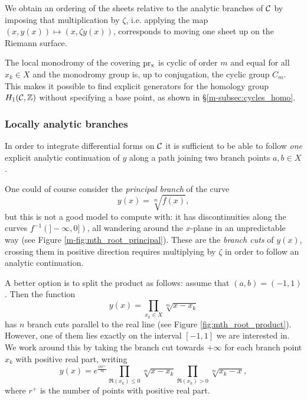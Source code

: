 \documentclass[main.tex]{subfiles}
\begin{document}
  \bigskip

  We obtain an ordering of the sheets relative
  to the analytic branches of $\mathcal{C}$ by imposing that multiplication by $\zeta$,
  i.e. applying the map $(x,y(x)) \mapsto (x,\zeta y(x))$, corresponds to
  moving one sheet up on the Riemann surface.

  The local monodromy of the covering $\operatorname{pr_x}$ is cyclic of order $m$ and equal for all $x_k \in X$
 and the monodromy group is, up to conjugation, the cyclic group $C_m$. This makes it possible to find explicit generators for the
  homology group $H_1(\mathcal{C},\mathbb{Z})$ without specifying a base point, as shown in \S \ref{m-subsec:cycles_homo}.

  \subsubsection{Locally analytic branches}\label{subsubsec:analytic_branches}

  In order to integrate differential forms on $\mathcal{C}$
  it is sufficient to be able to follow \emph{one} explicit analytic continuation of $y$ along a
  path joining two branch points $a, b \in X$.

  One could of course consider the \emph{principal branch} of the curve
  \begin{equation*}
      y(x) = \sqrt[m]{f(x)},
  \end{equation*}
  but this is not a good model to compute with: it has
  discontinuities along the curves $f^{-1}(]-\infty,0])$, all
  wandering around the $x$-plane in an unpredictable way (see Figure \ref{m-fig:mth_root_principal}).
  These are the \textit{branch cuts} of $y(x)$, crossing them in positive direction
  requires multiplying by $\zeta$ in order to follow an analytic continuation.


  A better option is to split the product as follows:
  assume that $(a,b) = (-1,1)$. Then the function
  \begin{equation*}
      y(x) = \prod_{x_k\in X}\sqrt[m]{x-x_k}
  \end{equation*}
  has $n$ branch cuts parallel to the real line (see Figure \ref{fig:mth_root_product}).
  However, one of them lies exactly on the interval $[-1,1]$ we are interested in. We work around this
  by taking the branch cut towards $+\infty$ for each branch point $x_k$ with positive real part, writing
  \begin{equation*}
      y(x) = e^{\frac{iπr^+}m}\prod_{\Re(x_k)\leq0}\sqrt[m]{x-x_k} \prod_{\Re(x_k)>0}\sqrt[m]{x_k-x},
  \end{equation*}
  where $r^+$ is the number of points with positive real part.
\end{document}
